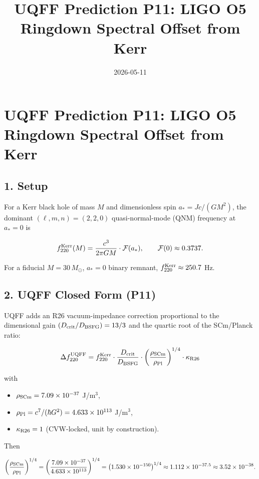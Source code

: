 \documentclass[
]{article}
\title{UQFF Prediction P11: LIGO O5 Ringdown Spectral Offset from Kerr}
\author{}
\date{2026-05-11}
\providecommand{\tightlist}{%
  \setlength{\itemsep}{0pt}\setlength{\parskip}{0pt}}
\begin{document}
\maketitle

\section{UQFF Prediction P11: LIGO O5 Ringdown Spectral Offset from
Kerr}\label{uqff-prediction-p11-ligo-o5-ringdown-spectral-offset-from-kerr}

\subsection{1. Setup}\label{setup}

For a Kerr black hole of mass \(M\) and dimensionless spin
\(a_* = J c / (G M^2)\), the dominant \((\ell, m, n) = (2,2,0)\)
quasi-normal-mode (QNM) frequency at \(a_* = 0\) is

\[
f_{220}^{\rm Kerr}(M) = \frac{c^3}{2\pi G M} \cdot \mathcal{F}(a_*) ,\qquad \mathcal{F}(0) \approx 0.3737 .
\]

For a fiducial \(M = 30\, M_\odot\), \(a_* = 0\) binary remnant,
\(f_{220}^{\rm Kerr} \approx 250.7\) Hz.

\subsection{2. UQFF Closed Form (P11)}\label{uqff-closed-form-p11}

UQFF adds an R26 vacuum-impedance correction proportional to the
dimensional gain \((D_{\rm crit}/D_{\rm BSFG}) = 13/3\) and the quartic
root of the SCm/Planck ratio:

\[
\Delta f_{220}^{\rm UQFF} = f_{220}^{\rm Kerr} \cdot \frac{D_{\rm crit}}{D_{\rm BSFG}} \cdot
\left(\frac{\rho_{\rm SCm}}{\rho_{\rm Pl}}\right)^{1/4} \cdot \kappa_{\rm R26}
\]

with

\begin{itemize}
\tightlist
\item
  \(\rho_{\rm SCm} = 7.09 \times 10^{-37}\) J/m\(^3\),
\item
  \(\rho_{\rm Pl} = c^7/(\hbar G^2) = 4.633 \times 10^{113}\) J/m\(^3\),
\item
  \(\kappa_{\rm R26} = 1\) (CVW-locked, unit by construction).
\end{itemize}

Then

\[
\left(\frac{\rho_{\rm SCm}}{\rho_{\rm Pl}}\right)^{1/4} = \left(\frac{7.09 \times 10^{-37}}{4.633 \times 10^{113}}\right)^{1/4}
= \left(1.530 \times 10^{-150}\right)^{1/4} \approx 1.112 \times 10^{-37.5} \approx 3.52 \times 10^{-38} .
\]
\end{document}
